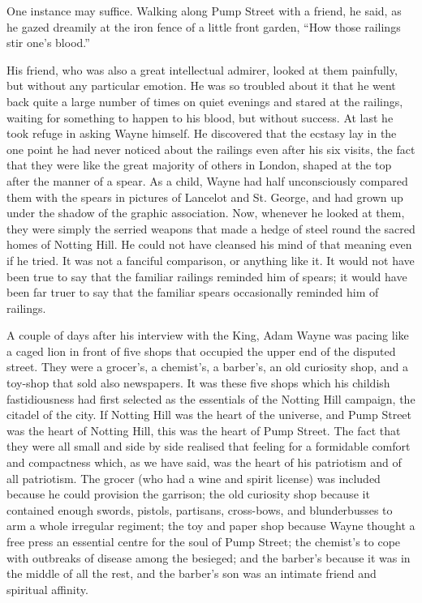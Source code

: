 \documentclass{book}
\begin{document}
One instance may suffice. Walking along Pump Street with a friend, he said, as he gazed dreamily at the iron fence of a little front garden, “How those railings stir one’s blood.”

His friend, who was also a great intellectual admirer, looked at them painfully, but without any particular emotion. He was so troubled about it that he went back quite a large number of times on quiet evenings and stared at the railings, waiting for something to happen to his blood, but without success. At last he took refuge in asking Wayne himself. He discovered that the ecstasy lay in the one point he had never noticed about the railings even after his six visits, the fact that they were like the great majority of others in London, shaped at the top after the manner of a spear. As a child, Wayne had half unconsciously compared them with the spears in pictures of Lancelot and St. George, and had grown up under the shadow of the graphic association. Now, whenever he looked at them, they were simply the serried weapons that made a hedge of steel round the sacred homes of Notting Hill. He could not have cleansed his mind of that meaning even if he tried. It was not a fanciful comparison, or anything like it. It would not have been true to say that the familiar railings reminded him of spears; it would have been far truer to say that the familiar spears occasionally reminded him of railings.

A couple of days after his interview with the King, Adam Wayne was pacing like a caged lion in front of five shops that occupied the upper end of the disputed street. They were a grocer’s, a chemist’s, a barber’s, an old curiosity shop, and a toy-shop that sold also newspapers. It was these five shops which his childish fastidiousness had first selected as the essentials of the Notting Hill campaign, the citadel of the city. If Notting Hill was the heart of the universe, and Pump Street was the heart of Notting Hill, this was the heart of Pump Street. The fact that they were all small and side by side realised that feeling for a formidable comfort and compactness which, as we have said, was the heart of his patriotism and of all patriotism. The grocer (who had a wine and spirit license) was included because he could provision the garrison; the old curiosity shop because it contained enough swords, pistols, partisans, cross-bows, and blunderbusses to arm a whole irregular regiment; the toy and paper shop because Wayne thought a free press an essential centre for the soul of Pump Street; the chemist’s to cope with outbreaks of disease among the besieged; and the barber’s because it was in the middle of all the rest, and the barber’s son was an intimate friend and spiritual affinity.
\end{document}
